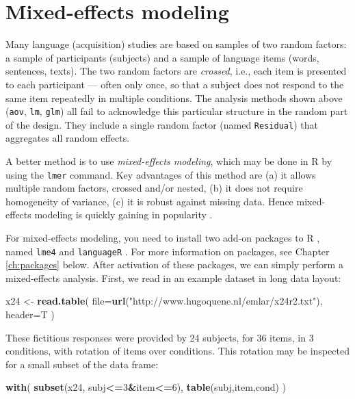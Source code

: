 \documentclass[]{book}
\newenvironment{Shaded}{\begin{snugshade}}{\end{snugshade}}
\newcommand{\DataTypeTok}[1]{\textcolor[rgb]{0.13,0.29,0.53}{#1}}
\newcommand{\DecValTok}[1]{\textcolor[rgb]{0.00,0.00,0.81}{#1}}
\newcommand{\KeywordTok}[1]{\textcolor[rgb]{0.13,0.29,0.53}{\textbf{#1}}}
\newcommand{\NormalTok}[1]{#1}
\newcommand{\OperatorTok}[1]{\textcolor[rgb]{0.81,0.36,0.00}{\textbf{#1}}}
\newcommand{\StringTok}[1]{\textcolor[rgb]{0.31,0.60,0.02}{#1}}
\begin{document}
\hypertarget{ch:mixedeffects}{%
\chapter{Mixed-effects modeling}\label{ch:mixedeffects}}

Many language (acquisition) studies are based on samples of two random
factors: a sample of participants (subjects) and a sample of language
items (words, sentences, texts). The two random factors are \emph{crossed},
i.e., each item is presented to each participant --- often only once, so
that a subject does not respond to the same item repeatedly in multiple
conditions. The analysis methods shown above
(\texttt{aov}, \texttt{lm},
\texttt{glm}) all fail to acknowledge this particular
structure in the random part of the design. They include a single random
factor (named \texttt{Residual}) that aggregates all
random effects.

A better method is to use \emph{mixed-effects modeling},
which may be done in R by using the \texttt{lmer} command. Key
advantages of this method are (a) it allows multiple random
factors, crossed and/or nested, (b) it does not require homogeneity of
variance, (c) it is robust against missing data. Hence mixed-effects
modeling is quickly gaining in popularity
\citep{QB04, QB08, baay08, HMS18}.

For mixed-effects modeling, you need to install two add-on packages to
R , named \texttt{lme4} and \texttt{languageR} \citep{BDB08}. For more
information on packages, see Chapter \ref{ch:packages} below.
After activation of these packages, we
can simply perform a mixed-effects analysis. First, we read in an
example dataset \citep{QB08} in long data layout:

\begin{Shaded}
\begin{Highlighting}[]
\NormalTok{x24 <-}\StringTok{ }\KeywordTok{read.table}\NormalTok{( }\DataTypeTok{file=}\KeywordTok{url}\NormalTok{(}\StringTok{"http://www.hugoquene.nl/emlar/x24r2.txt"}\NormalTok{), }\DataTypeTok{header=}\NormalTok{T )}
\end{Highlighting}
\end{Shaded}

These fictitious responses were provided by 24 subjects, for 36 items,
in 3 conditions, with rotation of items over conditions. This rotation
may be inspected for a small subset of the data frame:

\begin{Shaded}
\begin{Highlighting}[]
\KeywordTok{with}\NormalTok{( }\KeywordTok{subset}\NormalTok{(x24, subj}\OperatorTok{<=}\DecValTok{3}\OperatorTok{&}\NormalTok{item}\OperatorTok{<=}\DecValTok{6}\NormalTok{), }\KeywordTok{table}\NormalTok{(subj,item,cond) ) }
\end{Highlighting}
\end{Shaded}
\end{document}
